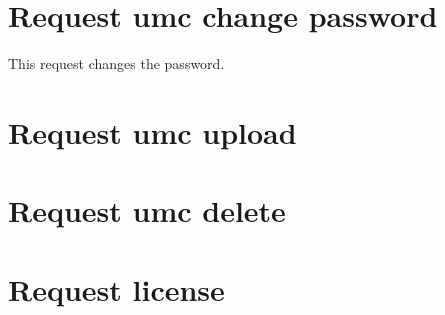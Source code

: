 \section{Request umc change password}
\label{wire:request_umc_change_password}

This request changes the password.


\section{Request umc upload}
\label{wire:request_umc_upload}


\section{Request umc delete}
\label{wire:request_umc_delete}

\section{Request license}
\label{wire:request_license}
